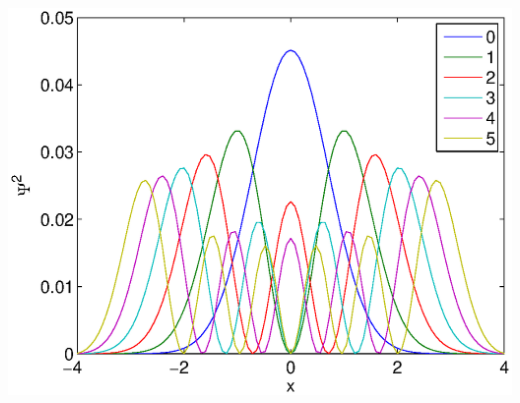 \documentclass[a4paper,10pt]{article}
\numberwithin{equation}{section}
\begin{document}
\includegraphics{numeric1}
\end{document}

